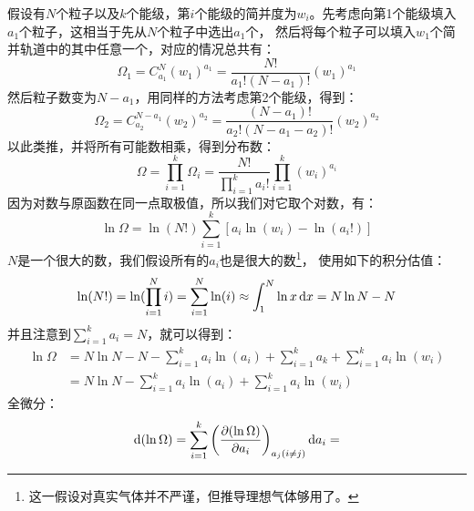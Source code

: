\begin{prove}
            假设有$N$个粒子以及$k$个能级，第$i$个能级的简并度为$w_i$。先考虑向第1个能级填入$a_1$个粒子，这相当于先从$N$个粒子中选出$a_1$个，
            然后将每个粒子可以填入$w_1$个简并轨道中的其中任意一个，对应的情况总共有：
            \begin{equation}
                \Omega_1 =C_{a_1}^{N} (w_1)^{a_1} = \frac{N!}{a_{1}!(N-a_{1})!} (w_1)^{a_1}
            \end{equation}
            然后粒子数变为$N-a_1$，用同样的方法考虑第2个能级，得到：
            \begin{equation}
                \Omega_2 =C_{a_2}^{N-a_1} (w_2)^{a_2} = \frac{(N-a_1)!}{a_{2}!(N-a_{1}-a_{2})!} (w_2)^{a_2}
            \end{equation}
            以此类推，并将所有可能数相乘，得到分布数：
            \begin{equation}
                \Omega = \prod_{i=1}^{k} \Omega_{i} = \frac{N!}{\prod_{i = 1}^{k}a_{i}!}\prod_{i = 1}^{k} (w_i)^{a_i}
            \end{equation}
            因为对数与原函数在同一点取极值，所以我们对它取个对数，有：
            \begin{equation}
                \ln\Omega = \ln(N!)\sum_{i = 1}^{k}[{a_i}\ln(w_i) - \ln(a_i!)]
            \end{equation}
            $N$是一个很大的数，我们假设所有的$a_i$也是很大的数\footnote{这一假设对真实气体并不严谨，但推导理想气体够用了。}，
            使用如下的积分估值：
            \begin{equation}
                \ln(N!) = \ln(\prod_{i=1}^{N}i)=\sum_{i=1}^{N}\ln(i) \approx \int_{1}^{N}\ln x\dif{x} = N\ln N-N
            \end{equation}
            并且注意到$\sum_{i=1}^{k}a_i=N$，就可以得到：
            \begin{equation}
                \begin{aligned}
                    \ln\Omega &= N\ln N-N-\sum_{i=1}^{k}a_{i}\ln(a_i)+\sum_{i=1}^{k}a_k+\sum_{i = 1}^{k}{a_i}\ln(w_i)\\
                    &=N\ln N-\sum_{i=1}^{k}a_{i}\ln(a_i)+\sum_{i = 1}^{k}{a_i}\ln(w_i)
                    \label{of_omega}
                \end{aligned}
            \end{equation}
            全微分：
            \begin{equation}
                \dif{(\ln\Omega)} = \sum_{i=1}^{k}\left(\frac{\partial (\ln\Omega)}{\partial a_i}\right)_{a_j(i\neq j)} \dif{a_i} = 

\end{equation}
\end{prove}
